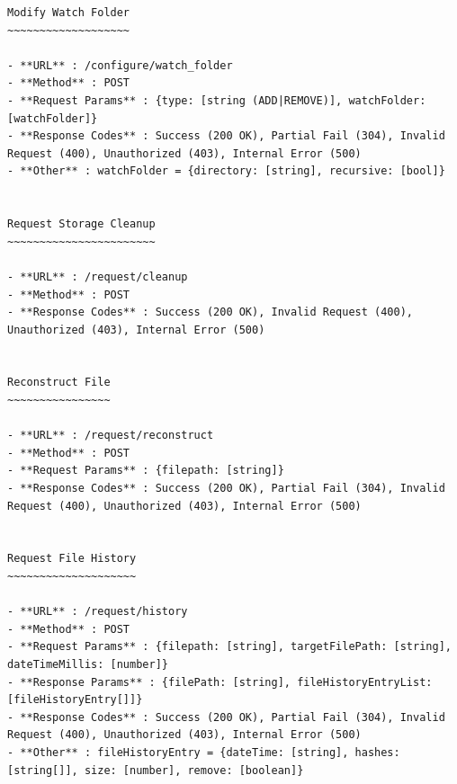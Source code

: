 \documentclass[11pt, a4paper, twocolumn, twoside]{report}
\begin{document}
\begin{lstlisting}[language=RsT, caption=Membrane API Documentation, label=lst:apiDocs]
Modify Watch Folder
~~~~~~~~~~~~~~~~~~~

- **URL** : /configure/watch_folder
- **Method** : POST
- **Request Params** : {type: [string (ADD|REMOVE)], watchFolder: [watchFolder]}
- **Response Codes** : Success (200 OK), Partial Fail (304), Invalid Request (400), Unauthorized (403), Internal Error (500)
- **Other** : watchFolder = {directory: [string], recursive: [bool]}


Request Storage Cleanup
~~~~~~~~~~~~~~~~~~~~~~~

- **URL** : /request/cleanup
- **Method** : POST
- **Response Codes** : Success (200 OK), Invalid Request (400), Unauthorized (403), Internal Error (500)


Reconstruct File
~~~~~~~~~~~~~~~~

- **URL** : /request/reconstruct
- **Method** : POST
- **Request Params** : {filepath: [string]}
- **Response Codes** : Success (200 OK), Partial Fail (304), Invalid Request (400), Unauthorized (403), Internal Error (500)


Request File History
~~~~~~~~~~~~~~~~~~~~

- **URL** : /request/history
- **Method** : POST
- **Request Params** : {filepath: [string], targetFilePath: [string], dateTimeMillis: [number]}
- **Response Params** : {filePath: [string], fileHistoryEntryList: [fileHistoryEntry[]]}
- **Response Codes** : Success (200 OK), Partial Fail (304), Invalid Request (400), Unauthorized (403), Internal Error (500)
- **Other** : fileHistoryEntry = {dateTime: [string], hashes: [string[]], size: [number], remove: [boolean]}
\end{lstlisting}
\end{document}
